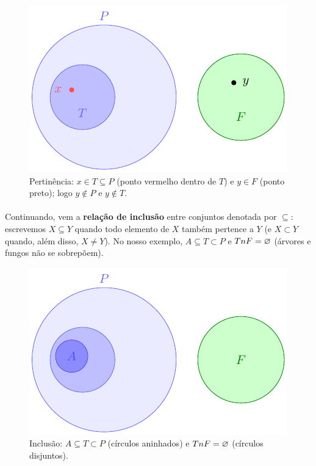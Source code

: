 \documentclass[12pt,a4paper]{article}
\def\cap{\string n}%
\begin{document}
\begin{figure}[H]
    \centering
    \includegraphics[width=0.9\linewidth]{figures/fig_pertinencia.pdf}

    \caption{Pertinência: $x\in T\subseteq P$ (ponto vermelho dentro de $T$) e $y\in F$ (ponto preto); logo $y\notin P$ e $y\notin T$.}
    \label{fig:pertinencia}\end{figure}


\paragraph{}
Continuando, vem a \textbf{relação de inclusão} entre conjuntos denotada por \(\subseteq\): escrevemos \(X \subseteq Y\) quando todo elemento de \(X\) também pertence a \(Y\) (e \(X\subset Y\) quando, além disso, \(X\neq Y\)). No nosso exemplo, \(A\subseteq T\subset P\) e \(T\cap F=\varnothing\) (árvores e fungos não se sobrepõem).


\begin{figure}[H]
    \centering
    \includegraphics[width=0.9\linewidth]{figures/fig_inclusao.pdf}

    \caption{\texorpdfstring{Inclusão: $A\subseteq T\subset P$ (círculos aninhados) e $T\cap F=\varnothing$ (círculos disjuntos).}{Inclusão: conjuntos aninhados e disjuntos}}
    \label{fig:inclusao}\end{figure}
\end{document}
